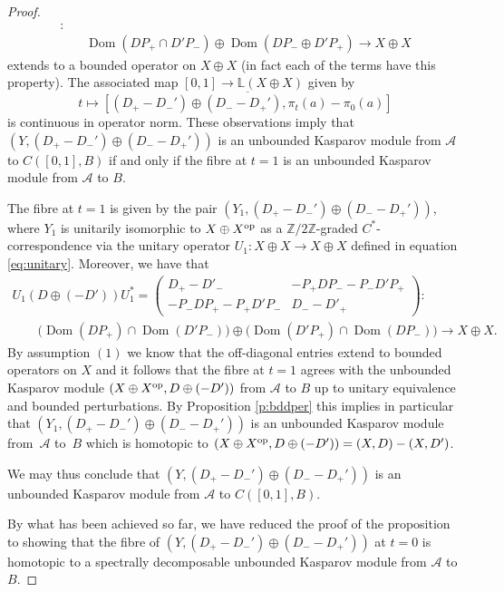 \documentclass[pdftex]{sigma}
\numberwithin{equation}{section}
\newcommand{\op}{\oplus}
\newcommand{\zz}{\mathbb{Z}}
\newcommand{\ov}{\overline}
\newcommand{\s}[1]{\mathscr{#1}}
\newcommand{\B}[1]{\mathbb{#1}}
\begin{document}
\begin{proof}
\begin{gather*}
 [ (D_+ - D_-') \op (D_- - D_+') , \pi_t(a) - \pi_0(a) ]
 \colon \\
 \qquad{} \operatorname{Dom}(DP_+ \cap D'P_-) \op \operatorname{Dom}(D P_- \op D'P_+) \to X \op X
\end{gather*}
extends to a bounded operator on $X \op X$ (in fact each of the terms have this property). The associated map $[0,1] \to \B L(X \op X)$ given by
\[
t \mapsto \ov{ [ (D_+ - D_-') \op (D_- - D_+') , \pi_t(a) - \pi_0(a) ] }
\]
is continuous in operator norm. These observations imply that $(Y, (D_+ - D_-') \op (D_- - D_+'))$ is an unbounded Kasparov module from $\s A$ to $C( [0,1],B)$ if and only if the fibre at $t = 1$ is an unbounded Kasparov module from $\s A$ to $B$.

The fibre at $t = 1$ is given by the pair $( Y_1, (D_+ - D_-') \op (D_- - D_+') )$, where $Y_1$ is unitarily isomorphic to $X \op X^{{\rm op}}$ as a $\zz/2\zz$-graded $C^*$-correspondence via the unitary operator $U_1\colon X \op X \to X \op X$ defined in equation~ \eqref{eq:unitary}. Moreover, we have that
\begin{gather*}
 U_1 ( D \op (- D') ) U_1^*
= \left(\begin{matrix} D_+ - D'_- & - P_+ D P_- - P_- D' P_+ \\ - P_- D P_+ - P_+ D' P_- & D_- - D'_+\end{matrix}\right)\colon \nonumber\\
\qquad{} \big( \operatorname{Dom}( DP_+) \cap \operatorname{Dom}( D' P_-) \big) \op \big( \operatorname{Dom}( D'P_+) \cap \operatorname{Dom}( D P_-) \big)%
\to X \op X .
\end{gather*}
By assumption $(1)$ we know that the off-diagonal entries extend to bounded operators on $X$ and it follows that the fibre at $t = 1$ agrees with the unbounded Kasparov module $(X \op X^{{\rm op}}, D \op (- D') )$ from $\s A$ to $B$ up to unitary equivalence and bounded perturbations. By Proposition \ref{p:bddper} this implies in particular that $(Y_1, (D_+ - D_-') \op (D_- - D_+'))$ is an unbounded Kasparov module from~$\s A$ to~$B$ which is homotopic to $(X \op X^{{\rm op}}, D \op (- D')) = (X,D) - (X, D')$.

We may thus conclude that $(Y,(D_+ - D_-') \op (D_- - D_+'))$ is an unbounded Kasparov module from $\s A$ to $C( [0,1],B)$.

By what has been achieved so far, we have reduced the proof of the proposition to showing that the fibre of $(Y, (D_+ - D_-') \op (D_- - D_+'))$ at $t = 0$ is homotopic to a spectrally decomposable unbounded Kasparov module from $\s A$ to $B$.


\end{proof}
\end{document}
